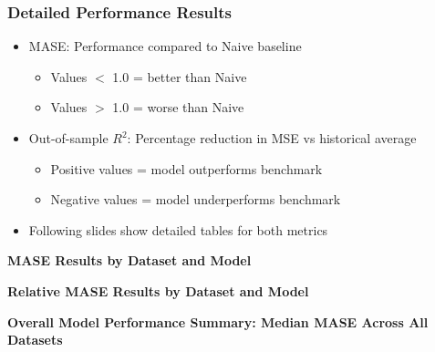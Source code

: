 \documentclass[ignorenonframetext, 9pt]{beamer}
\begin{document}
\begin{frame}
    \frametitle{Detailed Performance Results}
    \begin{itemize}
    \item MASE: Performance compared to Naive baseline
    \begin{itemize}
      \item Values $<$ 1.0 = better than Naive
      \item Values $>$ 1.0 = worse than Naive
    \end{itemize}
    \item Out-of-sample $R^2$: Percentage reduction in MSE vs historical average
    \begin{itemize}
      \item Positive values = model outperforms benchmark
      \item Negative values = model underperforms benchmark
    \end{itemize}
    \item Following slides show detailed tables for both metrics
    \end{itemize}
  \end{frame}
  
\begin{frame}[plain]
    \tiny
    \vspace{-0.5cm}
    \centering
    \textbf{MASE Results by Dataset and Model}\\
    \vspace{0.2cm}
    
  \end{frame}
  
  \begin{frame}[plain]
    \tiny
    \vspace{-0.5cm}
    \centering
    \textbf{Relative MASE Results by Dataset and Model}\\
    \vspace{0.2cm}
    
  \end{frame}

  \begin{frame}[plain]
    \tiny
    \vspace{-0.5cm}
    \centering
    \textbf{Overall Model Performance Summary: Median MASE Across All Datasets}\\
    \vspace{0.2cm}
    
  \end{frame}
\end{document}
